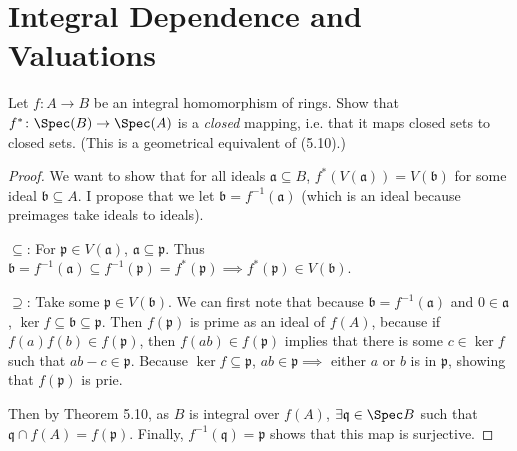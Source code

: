 \section{Integral Dependence and Valuations}

\begin{exercise}
	Let $f \colon A \to B$ be an integral homomorphism of rings. Show that $f^\ast\colon \Spec(B) \to \Spec(A)$ is a \textit{closed} mapping, i.e. that it maps closed sets to closed sets. (This is a geometrical equivalent of (5.10).)
\end{exercise}
\begin{proof}
	We want to show that for all ideals $\mathfrak{a} \subseteq B $, $f^\ast(V(\mathfrak{a})) = V(\mathfrak{b}) $ for some ideal $\mathfrak{b} \subseteq A $.
	I propose that we let $\mathfrak{b} = f^{-1}(\mathfrak{a}) $ (which is an ideal because preimages take ideals to ideals).
	
	$\subseteq  $: For $\mathfrak{p} \in V(\mathfrak{a}) $, $\mathfrak{a} \subseteq \mathfrak{p} $.
	Thus $\mathfrak{b} = f^{-1}(\mathfrak{a}) \subseteq f^{-1}(\mathfrak{p}) = f^\ast(\mathfrak{p}) \implies f^\ast(\mathfrak{p}) \in V(\mathfrak{b})$.

	$\supseteq  $: Take some $\mathfrak{p} \in V(\mathfrak{b}) $.
	We can first note that because $\mathfrak{b} = f^{-1}(\mathfrak{a}) $ and $0\in \mathfrak{a} $, $\ker f \subseteq \mathfrak{b} \subseteq \mathfrak{p} $.
	Then $f(\mathfrak{p}) $ is prime as an ideal of $f(A) $, because if $f(a)f(b) \in f(\mathfrak{p}) $, then $f(ab) \in f(\mathfrak{p})$ implies that there is some $c \in \ker f $ such that $ab - c \in \mathfrak{p} $.
	Because $\ker f \subseteq \mathfrak{p} $, $ab \in \mathfrak{p}\implies $ either $a $ or $b $ is in $\mathfrak{p} $, showing that $f(\mathfrak{p}) $ is prie.

	Then by Theorem 5.10, as $B $ is integral over $f(A) $, $\exists \mathfrak{q} \in \Spec B $ such that $\mathfrak{q}\cap f(A) = f(\mathfrak{p})$.
	Finally, $f^{-1}(\mathfrak{q}) = \mathfrak{p}$ shows that this map is surjective.
\end{proof}

